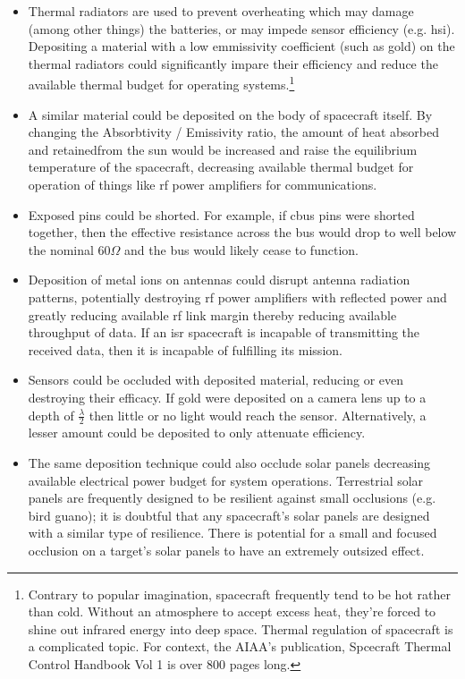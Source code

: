 \begin{itemize}

\item Thermal radiators are used to prevent overheating which may
  damage (among other things) the batteries, or may impede sensor
  efficiency (e.g. \acf{hsi}).  Depositing a material with a low
  emmissivity coefficient (such as gold) on the thermal radiators
  could significantly impare their efficiency and reduce the available
  thermal budget for operating systems.\footnote{Contrary to popular
  imagination, spacecraft frequently tend to be hot rather than cold.
  Without an atmosphere to accept excess heat, they're forced to shine
  out infrared energy into deep space.  Thermal regulation of
  spacecraft is a complicated topic.  For context, the AIAA's
  publication, Spcecraft Thermal Control Handbook Vol 1
  \cite{thermals} is over 800 pages long.}

\item A similar material could be deposited on the body of spacecraft
  itself.  By changing the Absorbtivity / Emissivity ratio, the amount
  of heat absorbed and retainedfrom the sun would be increased and raise the
  equilibrium temperature of the spacecraft, decreasing available
  thermal budget for operation of things like \ac{rf} power amplifiers
  for communications.

\item Exposed pins could be shorted.  For example, if \ac{cbus} pins
  were shorted together, then the effective resistance across the bus
  would drop to well below the nominal $60\Omega$ and the bus would
  likely cease to function.

\item Deposition of metal ions on antennas could disrupt antenna
  radiation patterns, potentially destroying \ac{rf} power amplifiers
  with reflected power and greatly reducing available \ac{rf} link
  margin thereby reducing available throughput of data.  If an
  \ac{isr} spacecraft is incapable of transmitting the received
  data, then it is incapable of fulfilling its mission.

\item Sensors could be occluded with deposited material, reducing or
  even destroying their efficacy.  If gold were deposited on a camera
  lens up to a depth of $\frac{\lambda}{2}$ then little or no light
  would reach the sensor.  Alternatively, a lesser amount could be
  deposited to only attenuate efficiency.
  
\item The same deposition technique could also occlude solar panels
  decreasing available electrical power budget for system operations.
  Terrestrial solar panels are frequently designed to be resilient
  against small occlusions (e.g. bird guano); it is doubtful that any
  spacecraft's solar panels are designed with a similar type of
  resilience.  There is potential for a small and focused occlusion on
  a target's solar panels to have an extremely outsized effect.


\end{itemize}
